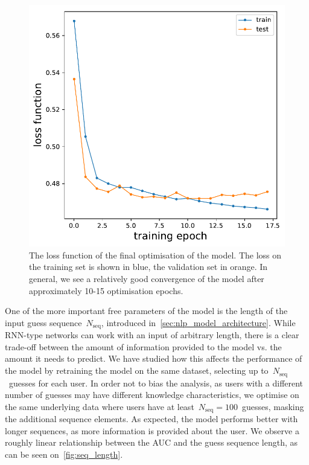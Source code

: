 \begin{figure}[ht]
\centering
\includegraphics[width=0.5\linewidth]{figures/lingvist/loss.pdf}
\caption[Loss function for the knowledge estimation model]{The loss function of the final optimisation of the model. The loss on the training set is shown in blue, the validation set in orange. In general, we see a relatively good convergence of the model after approximately 10-15 optimisation epochs.} 
\label{fig:loss} 
\end{figure} 

One of the more important free parameters of the model is the length of the input guess sequence~$N_{\mathrm{seq}}$, introduced in~\cref{sec:nlp_model_architecture}. While RNN-type networks can work with an input of arbitrary length, there is a clear trade-off between the amount of information provided to the model vs. the amount it needs to predict.
We have studied how this affects the performance of the model by retraining the model on the same dataset, selecting up to~$N_{\mathrm{seq}}$~guesses for each user. In order not to bias the analysis, as users with a different number of guesses may have different knowledge characteristics, we optimise on the same underlying data where users have at least~$N_{\mathrm{seq}} = 100$~guesses, masking the additional sequence elements. As expected, the model performs better with longer sequences, as more information is provided about the user. We observe a roughly linear relationship between the AUC and the guess sequence length, as can be seen on~\cref{fig:seq_length}.

